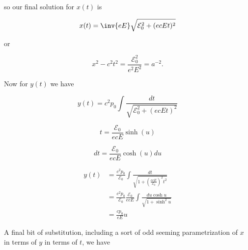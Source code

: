 {so our final solution for \(x(t)\) is

\begin{equation}\label{eqn:relativisticElectrodynamicsT3:300}
x(t) = \inv{e E} \sqrt{ \mathcal{E}_0^2 + (e c E t)^2 }
\end{equation}

or

\begin{equation}\label{eqn:relativisticElectrodynamicsT3:320}
x^2 - c^2 t^2 = \frac{\mathcal{E}_0^2}{ e^2 E^2 } = a^{-2}.
\end{equation}

Now for \(y(t)\) we have

\begin{equation}\label{eqn:relativisticElectrodynamicsT3:340}
y(t) = c^2 p_0 \int \frac{dt}{ \sqrt{\mathcal{E}_0^2 + (e c E t)^2 }}
\end{equation}

\begin{equation}\label{eqn:relativisticElectrodynamicsT3:360}
t = \frac{\mathcal{E}_0}{ e c E} \sinh(u)
\end{equation}

\begin{equation}\label{eqn:relativisticElectrodynamicsT3:380}
dt = \frac{\mathcal{E}_0}{ e c E} \cosh(u) du
\end{equation}

\begin{equation}\label{eqn:relativisticElectrodynamicsT3:970}
\begin{aligned}
y(t) 
&= \frac{c^2 p_0}{\mathcal{E}_0} \int \frac{dt}{\sqrt{1 + (\frac{e c E}{\mathcal{E}_0})^2 t^2 }} \\
&= \frac{c^2 p_0}{\mathcal{E}_0} 
\frac{\mathcal{E}_0}{ e c E} 
\int \frac{ du \cosh u }{\sqrt{1 + \sinh^2 u }} \\
&= \frac{c p_0}{ e E} u 
\end{aligned}
\end{equation}

A final bit of substitution, including a sort of odd seeming parametrization of \(x\) in terms of \(y\) in terms of \(t\), we have


}
